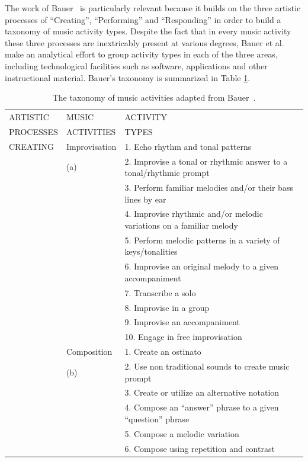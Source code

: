 \documentclass[10pt,journal,compsoc]{IEEEtran}
\begin{document}
The work of Bauer~\cite{bauer2014music} is particularly relevant because it builds on the three artistic processes of ``Creating'', ``Performing'' and ``Responding'' in order to build a taxonomy of music activity types. Despite the fact that in every music activity these three processes are inextricably present at various degrees, Bauer et al. 
\cite{bauerharris} make an analytical effort to group activity types in each of the three areas, including technological facilities such as software, applications and other instructional material. Bauer's taxonomy is summarized in Table \ref{tab:bauer}.
\begin{table}[htbp]
	\caption{The taxonomy of music activities adapted from Bauer~\cite{bauerharris, bauer2014music}.}
	\label{tab:bauer}
	\centering
	\begin{tabular}{p{}p{}p{}}
		ARTISTIC  & MUSIC & ACTIVITY \\
		PROCESSES  & ACTIVITIES & TYPES \\
		\hline\noalign{\smallskip}
		CREATING & Improvisation & 1. Echo rhythm and tonal patterns\\
		& (a) & 2. Improvise a tonal or rhythmic answer to a tonal/rhythmic prompt\\
		& & 3. Perform familiar melodies and/or their bass lines by ear\\
		& & 4. Improvise rhythmic and/or melodic variations on a familiar melody\\
		& & 5. Perform melodic patterns in a variety of keys/tonalities\\
		& & 6. Improvise an original melody to a given accompaniment\\
		& & 7. Transcribe a solo\\
		& & 8. Improvise in a group\\
		& & 9. Improvise an accompaniment\\
		& & 10. Engage in free improvisation\\
		
		\cline{2-3}
		
		& Composition & 1. Create an ostinato\\
		& (b) & 2. Use non traditional sounds to create music prompt\\
		& & 3. Create or utilize an alternative notation\\
		& & 4. Compose an ``answer'' phrase to a given ``question'' phrase\\
		& & 5. Compose a melodic variation\\
		& & 6. Compose using repetition and contrast\\
		

\end{tabular}
\end{table}
\end{document}
